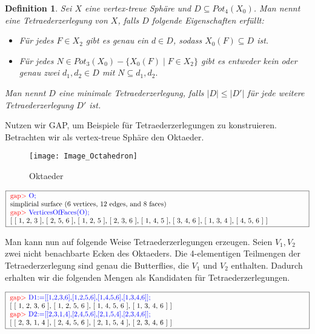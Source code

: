 \documentclass[12pt,titlepage,twoside,cleardoublepage]{article}
\theoremstyle{nummermitklammern}
\newtheorem{definition}[temp]{Definition}
\newtheorem{definition}[zahl]{Definition}
\numberwithin{equation}{section}
\begin{document}
\begin{definition}
Sei $X$ eine vertex-treue Sphäre und $D\subseteq Pot_4(X_0)$. Man nennt eine Tetraederzerlegung von $X$, falls $D$ folgende Eigenschaften erfüllt:
\begin{itemize}
\item Für jedes $F\in X_2$ gibt es genau ein $d\in D$, sodass $X_0(F) \subseteq D$ ist.
\item Für jedes $N\in Pot_3(X_0)-\{X_0(F)\mid F\in X_2\}$ gibt es entweder kein oder genau zwei $d_1,d_2\in D$ mit $N\subseteq d_1,d_2.$
\end{itemize}
Man nennt $D$ eine minimale Tetraederzerlegung, falls $\vert D \vert\leq \vert D' \vert$ für jede weitere Tetraederzerlegung $D'$ ist.
\end{definition}


Nutzen wir GAP, um Beispiele für Tetraederzerlegungen zu konstruieren. Betrachten wir als vertex-treue Sphäre den Oktaeder.
\begin{figure}[H]
\begin{center}
\texttt{[image: Image\_Octahedron]}
\end{center}
\caption{Oktaeder}
\end{figure}
\begin{center}
$\fbox{
\parbox{15cm}{
\textcolor{red}{gap$>$} \textcolor{blue}{O;}\newline 
simplicial surface (6 vertices, 12 edges, and 8 faces) \newline
\textcolor{red}{gap$>$} \textcolor{blue}{VerticesOfFaces(O);}\newline
[ [ 1, 2, 3 ], [ 2, 5, 6 ], [ 1, 2, 5 ], [ 2, 3, 6 ], [ 1, 4, 5 ],  [ 3, 4, 6 ], [ 1, 3, 4 ], [ 4, 5, 6 ] ]
}}$
\end{center}
Man kann nun auf folgende Weise Tetraederzerlegungen erzeugen.
Seien $V_1,V_2$ zwei nicht benachbarte Ecken des Oktaeders.
Die 4-elementigen Teilmengen der Tetraederzerlegung sind genau die Butterflies, die $V_1$ und $V_2$ enthalten. Dadurch erhalten wir die folgenden Mengen als Kandidaten für Tetraederzerlegungen.
\begin{center}
$\fbox{
\parbox{15cm}{
\textcolor{red}{gap$>$}  \textcolor{blue}{D1:=[[1,2,3,6],[1,2,5,6],[1,4,5,6],[1,3,4,6]];}\newline
[ [ 1, 2, 3, 6 ], [ 1, 2, 5, 6 ], [ 1, 4, 5, 6 ], [ 1, 3, 4, 6 ] ]\newline
\textcolor{red}{gap$>$}  \textcolor{blue}{D2:=[[2,3,1,4],[2,4,5,6],[2,1,5,4],[2,3,4,6]];}\newline
[ [ 2, 3, 1, 4 ], [ 2, 4, 5, 6 ], [ 2, 1, 5, 4 ], [ 2, 3, 4, 6 ] ]
}}$
\end{center}
\end{document}
